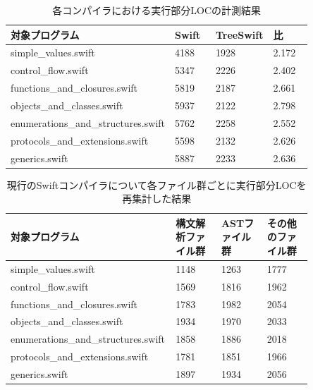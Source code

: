 \begin{table}[!hbtp]
    \begin{center}
        \caption{各コンパイラにおける実行部分LOCの計測結果}
        \begin{tabular}{|p{0.4\linewidth}|p{0.15\linewidth}|p{0.15\linewidth}|p{0.15\linewidth}|}
            \hline
            対象プログラム & Swift & TreeSwift & 比\\
            \hline
            \hline
            simple\_values.swift & 4188 & 1928 & 2.172\\
            \hline
            control\_flow.swift & 5347 & 2226 & 2.402\\
            \hline
            functions\_and\_closures.swift & 5819 & 2187 & 2.661\\
            \hline
            objects\_and\_classes.swift & 5937 & 2122 & 2.798\\
            \hline
            enumerations\_and\_structures.swift & 5762 & 2258 & 2.552\\
            \hline
            protocols\_and\_extensions.swift & 5598 & 2132 & 2.626\\
            \hline
            generics.swift & 5887 & 2233 & 2.636\\
            \hline
        \end{tabular}
        \label{table:loc-result}
    \end{center}
\end{table}

\begin{table}[!hbtp]
    \begin{center}
        \caption{現行のSwiftコンパイラについて各ファイル群ごとに実行部分LOCを再集計した結果}
        \begin{tabular}{|p{0.4\linewidth}|p{0.15\linewidth}|p{0.15\linewidth}|p{0.15\linewidth}|}
            \hline
            対象プログラム & 構文解析ファイル群 & ASTファイル群 & その他のファイル群\\
            \hline
            \hline
            simple\_values.swift & 1148 & 1263 & 1777\\
            \hline
            control\_flow.swift & 1569 & 1816 & 1962\\
            \hline
            functions\_and\_closures.swift & 1783 & 1982 & 2054\\
            \hline
            objects\_and\_classes.swift & 1934 & 1970 & 2033\\
            \hline
            enumerations\_and\_structures.swift & 1858 & 1886 & 2018\\
            \hline
            protocols\_and\_extensions.swift & 1781 & 1851 & 1966\\
            \hline
            generics.swift & 1897 & 1934 & 2056\\
            \hline
        \end{tabular}
        \label{table:loc-swift-per-file}
    \end{center}
\end{table}

